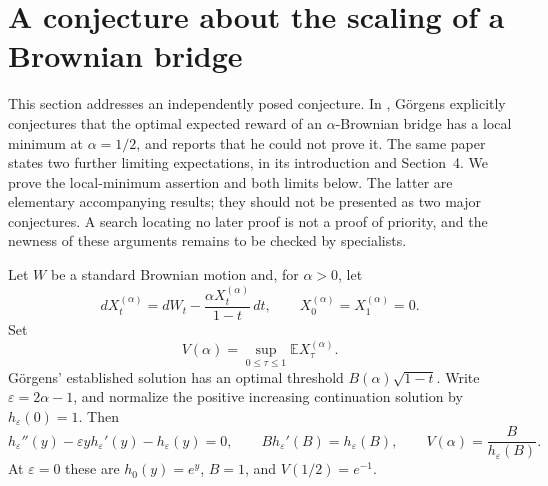 \documentclass[11pt,a4paper]{article}
\theoremstyle{definition}
\theoremstyle{remark}
\numberwithin{equation}{section}
\begin{document}
\section{A conjecture about the scaling of a Brownian bridge}
\label{p2:sec:gorgens-conjecture}

This section addresses an independently posed conjecture. In
\cite[Section~4]{p2:Gorgens2014}, G\"orgens explicitly conjectures that the
optimal expected reward of an $\alpha$-Brownian bridge has a local minimum
at $\alpha=1/2$, and reports that he could not prove it. The same paper
states two further limiting expectations, in its introduction and
Section~4. We prove the local-minimum assertion and both limits below.
The latter are elementary accompanying results; they should not be
presented as two major conjectures. A search locating no later proof is
not a proof of priority, and the newness of these arguments remains to
be checked by specialists.

Let $W$ be a standard Brownian motion and, for $\alpha>0$, let
\[
 dX_t^{(\alpha)}=dW_t-\frac{\alpha X_t^{(\alpha)}}{1-t}\,dt,
 \qquad X_0^{(\alpha)}=X_1^{(\alpha)}=0.
\]
Set
\[
 V(\alpha)=\sup_{0\leq\tau\leq1}\mathbb E X_\tau^{(\alpha)}.
\]
G\"orgens' established solution has an optimal threshold
$B(\alpha)\sqrt{1-t}$. Write $\varepsilon=2\alpha-1$, and normalize the
positive increasing continuation solution by $h_\varepsilon(0)=1$.
Then
\begin{equation}\label{p2:eq:gorgens-ode}
 h_\varepsilon''(y)-\varepsilon y h_\varepsilon'(y)
     -h_\varepsilon(y)=0,\qquad
 B h_\varepsilon'(B)=h_\varepsilon(B),\qquad
 V(\alpha)=\frac{B}{h_\varepsilon(B)}.
\end{equation}
At $\varepsilon=0$ these are $h_0(y)=e^y$, $B=1$, and $V(1/2)=e^{-1}$.
\end{document}
